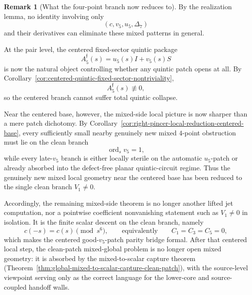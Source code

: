 \documentclass[11pt,a4paper]{amsart}
\theoremstyle{plain}
\theoremstyle{definition}
\newtheorem{remark}[theorem]{Remark}
\begin{document}
\begin{remark}[What the four-point branch now reduces to]
By the realization lemma, no identity involving only
\[
(c,v_5,u_5,\Delta_7)
\]
and their derivatives can eliminate these mixed patterns in general.

At the pair level, the centered fixed-sector quintic package
\[
A_5^{\mathfrak f}(s)=u_5(s)I+v_5(s)S
\]
is now the natural object controlling whether any quintic patch opens at all.
By Corollary~\ref{cor:centered-quintic-fixed-sector-nontriviality},
\[
A_5^{\mathfrak f}(s)\not\equiv 0,
\]
so the centered branch cannot suffer total quintic collapse.

Near the centered base, however, the mixed-side local picture is now sharper
than a mere patch dichotomy. By
Corollary~\ref{cor:right-pincer-local-reduction-centered-base}, every
sufficiently small nearby genuinely new mixed $4$-point obstruction must lie
on the clean branch
\[
\operatorname{ord}_s v_5=1,
\]
while every late-$v_5$ branch is either locally sterile on the automatic
$u_5$-patch or already absorbed into the defect-free planar
quintic-circuit regime. Thus the genuinely new mixed local geometry near the
centered base has been reduced to the single clean branch $V_1\neq 0$.

Accordingly, the remaining mixed-side theorem is no longer another lifted jet
computation, nor a pointwise coefficient nonvanishing statement such as
$V_1\neq 0$ in isolation. It is the finite scalar descent on the clean branch,
namely
\[
c(-s)=c(s)\pmod{s^6},
\qquad\text{equivalently}\qquad
C_1=C_3=C_5=0,
\]
which makes the centered good-$v_5$-patch parity bridge formal. After that
centered local step, the clean-patch mixed-global problem is no longer open
mixed geometry: it is absorbed by the mixed-to-scalar capture theorem
(Theorem~\ref{thm:global-mixed-to-scalar-capture-clean-patch}), with the
source-level viewpoint serving only as the correct language for the lower-core
and source-coupled handoff walls.
\end{remark}
\end{document}
